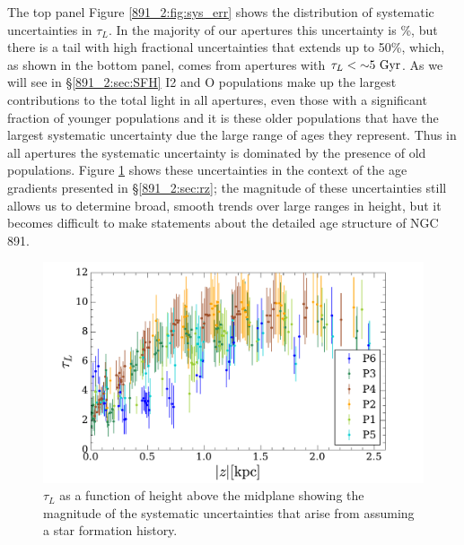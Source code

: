 The top panel Figure \ref{891_2:fig:sys_err} shows the distribution of
systematic uncertainties in $\tau_L$. In the majority of our apertures
this uncertainty is \%, but there is a tail with high
fractional uncertainties that extends up to 50\%, which, as shown in
the bottom panel, comes from apertures with $\tau_L < {\sim}
  5~\mathrm{Gyr} $. As we will see in \S\ref{891_2:sec:SFH} I2 and O
populations make up the largest contributions to the total light in
all apertures, even those with a significant fraction of younger
populations and it is these older populations that have the largest
systematic uncertainty due the large range of ages they
represent. Thus in all apertures the systematic uncertainty is
dominated by the presence of old populations. Figure
\ref{891_2:fig:MLWA_sys_err} shows these uncertainties in the context
of the age gradients presented in \S\ref{891_2:sec:rz}; the magnitude
of these uncertainties still allows us to determine broad, smooth
trends over large ranges in height, but it becomes difficult to make
statements about the detailed age structure of NGC 891.



\begin{figure}
  \centering
  \includegraphics[width=\columnwidth]{891_2/figs/MLWA_sys_err.pdf}
  \caption[Systematic $\tau_L$ uncertainties in relation to our data]
          {\fixspacing\label{891_2:fig:MLWA_sys_err}$\tau_L$ as a
            function of height above the midplane showing the
            magnitude of the systematic uncertainties that arise from
            assuming a star formation history.}
\end{figure}

